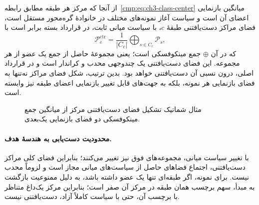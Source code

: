 از آنجا که مرکز هر طبقه مطابق رابطه~\eqref{cmp:eq:ch3-class-center} میانگین بازنمایی اعضای آن است و سیاست آغاز نمونه‌های مختلف در خانوادهٔ گره‌محور مستقل است، فضای مراکز دست‌یافتنی طبقهٔ $c$، با سیاست میانی ثابت، در قرارداد بسته برابر است با
\begin{equation}\label{cmp:eq:ch3-geometry-center-minkowski}
\boxed{\mathcal P_c^{\mathrm{ctr}}=\frac{1}{|C_c|}\bigoplus_{s\in C_c}\mathcal P_s,}
\end{equation}
که در آن $\oplus$ جمع مینکوفسکی است؛ یعنی مجموعهٔ حاصل از جمع یک عضو از هر مجموعه. این فضای دست‌یافتنی یک چندوجهی محدب و کراندار است و در قرارداد اصلی، درون نسبی آن دست‌یافتنی خواهد بود. بدین ترتیب، شکل فضای مراکز نه‌تنها به فضای بازنمایی هر نمونه، بلکه به جهت‌های قابل تغییر بازنمایی اعضای طبقه نیز وابسته است.
\begin{figure}[!htbp]
\centering
\begin{LTR}
\end{LTR}
\caption{مثال شماتیک تشکیل فضای دست‌یافتنی مرکز از میانگین جمع مینکوفسکی دو فضای بازنمایی یک‌بعدی.}
\label{cmp:fig:ch3-geometry-minkowski}
\end{figure}

\paragraph{محدودیت دست‌یابی به هندسهٔ هدف.}
با تغییر سیاست میانی، مجموعه‌های فوق نیز تغییر می‌کنند؛ بنابراین فضای کلی مراکز دست‌یافتنی، اجتماع فضاهای حاصل از سیاست‌های میانی مجاز است و لزوماً محدب نیست. برای نمونه، اگر طبقه‌ای تنها یک عضو داشته باشد، به دلیل ممنوعیت بازگشت به مبدأ، سهم برچسب همان طبقه در مرکز آن صفر است؛ بنابراین مرکز یک‌داغ متناظر با برچسب آن، حتی با سیاست کاملاً آزاد، دست‌یافتنی نیست.


